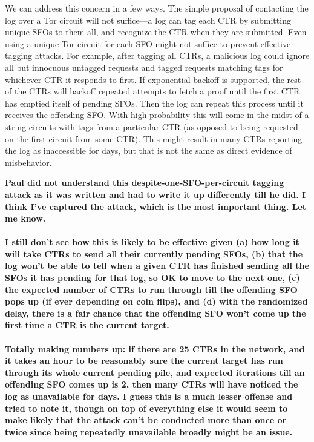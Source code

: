 We can address this concern in a few ways. The simple proposal of contacting
the log over a Tor circuit will not suffice---a log can tag each CTR by
submitting unique SFOs to them all, and recognize the CTR when they are
submitted. Even using a unique Tor circuit for each SFO might not suffice
to prevent effective tagging attacks. For example, after tagging all
CTRs, a malicious log could ignore all but innocuous untagged requests and
tagged requests matching tags for whichever CTR it responds to first.
If exponential backoff is supported, the rest of the CTRs will backoff
repeated attempts to fetch a proof until the first CTR has emptied itself
of pending SFOs. Then the log can repeat this process until it receives
the offending SFO\@. With high probability this will come in the midst
of a string circuits with tags from a particular CTR (as opposed to being
requested on the first circuit from some CTR). This might result in
many CTRs reporting the log as inaccessible for days, but that is not
the same as direct evidence of misbehavior.

{\bf \color{red} Paul did not understand this
  despite-one-SFO-per-circuit tagging attack as it was written and had
  to write it up differently till he did. I think I've captured the
  attack, which is the most important thing. Let me know.\\ \\
  I still don't see how this is likely to be effective
  given (a) how long it will take CTRs to send all their currently
  pending SFOs, (b) that the log won't be able to tell when a given
  CTR has finished sending all the SFOs it has pending for that log,
  so OK to move to the next one, (c) the expected number of CTRs to
  run through till the offending SFO pops up (if ever depending on
  coin flips), and (d) with the randomized delay, there is a fair
  chance that the offending SFO won't come up the first time a CTR is
  the current target.\\ \\
  Totally making numbers up: if there are 25 CTRs in the network, and
  it takes an hour to be reasonably sure the current target has run
  through its whole current pending pile, and expected iterations till
  an offending SFO comes up is 2, then many CTRs will have noticed
  the log as unavailable for days. I guess this is a much lesser
  offense and tried to note it, though on top of everything else
  it would seem to make likely that the attack can't be conducted
  more than once or twice since being repeatedly unavailable broadly
  might be an issue.}


